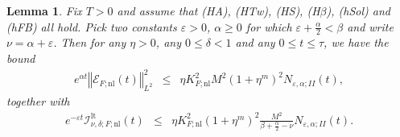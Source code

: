 \documentclass[10pt]{articleHJ}
\newcommand{\e}{\ensuremath{\varepsilon}}
\newcommand{\norm}[1]{\left\Vert#1\right\Vert}		%
\newtheorem{lem}[thm]{Lemma}
\numberwithin{equation}{section}
\begin{document}
\begin{lem}
Fix $T > 0$ and assume that (HA), (HTw), (HS), (H$\beta$),
(hSol) and (hFB) all hold.
Pick two constants $\e > 0$, $\alpha \ge 0$
for which $ \e + \frac{\alpha}{2} < \beta$
and write $\nu = \alpha + \e$.
Then for any
$\eta > 0$,
any $0 \le \delta < 1$
and any $0 \le t \le \tau$,
we have the bound
\begin{equation}
\begin{array}{lcl}
e^{\alpha t} \norm{\mathcal{E}_{F;\mathrm{nl}}(t)}_{L^2}^2
 & \le &  \eta K_{F;\mathrm{nl}}^2 M^2( 1 + \eta^m)^2
  N_{\e,\alpha;II}(t),
\end{array}
\end{equation}
together with
\begin{equation}
\begin{array}{lcl}
 e^{-\e t} \mathcal{I}^{\mathrm{lt}}_{\nu,\delta;F;\mathrm{nl}}(t)
 & \le &    \eta K_{F;\mathrm{nl}}^2 ( 1 + \eta^m)^2
   \frac{M^2}{ \beta + \frac{\alpha}{2} - \nu }
      N_{\e,\alpha;II}(t) .
\end{array}
\end{equation}
\end{lem}
\end{document}
